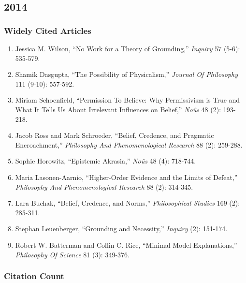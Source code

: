 \documentclass[
  10pt,
  letterpaper,
  DIV=11,
  numbers=noendperiod,
  twoside]{scrartcl}
\providecommand{\tightlist}{%
  \setlength{\itemsep}{0pt}\setlength{\parskip}{0pt}}\usepackage{longtable,booktabs,array}
\begin{document}
\newpage

\subsection{2014}\label{sec-s2014}

\subsubsection*{Widely Cited Articles}\label{widely-cited-articles-38}

\begin{enumerate}
\def\labelenumi{\arabic{enumi}.}
\tightlist
\item
  Jessica M. Wilson, ``No Work for a Theory of Grounding,''
  \emph{Inquiry} 57 (5-6): 535-579.
\item
  Shamik Dasgupta, ``The Possibility of Physicalism,'' \emph{Journal Of
  Philosophy} 111 (9-10): 557-592.
\item
  Miriam Schoenfield, ``Permission To Believe: Why Permissivism is True
  and What It Tells Us About Irrelevant Influences on Belief,''
  \emph{Noûs} 48 (2): 193-218.
\item
  Jacob Ross and Mark Schroeder, ``Belief, Credence, and Pragmatic
  Encroachment,'' \emph{Philosophy And Phenomenological Research} 88
  (2): 259-288.
\item
  Sophie Horowitz, ``Epistemic Akrasia,'' \emph{Noûs} 48 (4): 718-744.
\item
  Maria Lasonen-Aarnio, ``Higher-Order Evidence and the Limits of
  Defeat,'' \emph{Philosophy And Phenomenological Research} 88 (2):
  314-345.
\item
  Lara Buchak, ``Belief, Credence, and Norms,'' \emph{Philosophical
  Studies} 169 (2): 285-311.
\item
  Stephan Leuenberger, ``Grounding and Necessity,'' \emph{Inquiry} (2):
  151-174.
\item
  Robert W. Batterman and Collin C. Rice, ``Minimal Model
  Explanations,'' \emph{Philosophy Of Science} 81 (3): 349-376.
\end{enumerate}

\subsubsection*{Citation Count}\label{sec-count-2014}
\end{document}
